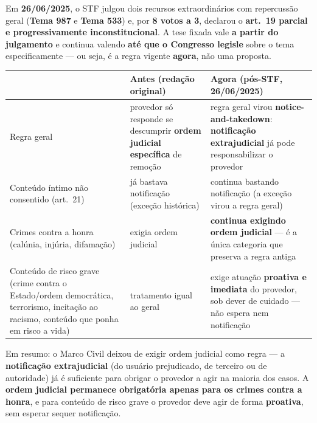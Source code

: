 \begin{conceito}
Em \textbf{26/06/2025}, o STF julgou dois recursos extraordinários com
repercussão geral (\textbf{Tema 987} e \textbf{Tema 533}) e, por
\textbf{8 votos a 3}, declarou o \textbf{art.\ 19 parcial e
progressivamente inconstitucional}. A tese fixada vale \textbf{a partir do
julgamento} e continua valendo \textbf{até que o Congresso legisle} sobre o
tema especificamente --- ou seja, é a regra vigente \textbf{agora}, não uma
proposta.
\end{conceito}

\begin{center}
\begin{tabular}{@{}p{3cm}p{4.6cm}p{4.6cm}@{}}
\toprule
& \textbf{Antes (redação original)} & \textbf{Agora (pós-STF, 26/06/2025)} \\
\midrule
Regra geral & provedor só responde se descumprir \textbf{ordem judicial específica} de remoção & regra geral virou \textbf{notice-and-takedown}: \textbf{notificação extrajudicial} já pode responsabilizar o provedor \\
Conteúdo íntimo não consentido (art.\ 21) & já bastava notificação (exceção histórica) & continua bastando notificação (a exceção virou a regra geral) \\
Crimes contra a honra (calúnia, injúria, difamação) & exigia ordem judicial & \textbf{continua exigindo ordem judicial} --- é a única categoria que preserva a regra antiga \\
Conteúdo de risco grave (crime contra o Estado/ordem democrática, terrorismo, incitação ao racismo, conteúdo que ponha em risco a vida) & tratamento igual ao geral & exige atuação \textbf{proativa e imediata} do provedor, sob dever de cuidado --- não espera nem notificação \\
\bottomrule
\end{tabular}
\end{center}

Em resumo: o Marco Civil deixou de exigir ordem judicial como regra --- a
\textbf{notificação extrajudicial} (do usuário prejudicado, de terceiro ou de
autoridade) já é suficiente para obrigar o provedor a agir na maioria dos
casos. A \textbf{ordem judicial permanece obrigatória apenas para os crimes
contra a honra}, e para conteúdo de risco grave o provedor deve agir de
forma \textbf{proativa}, sem esperar sequer notificação.

